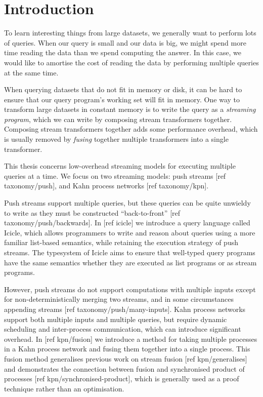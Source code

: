 \section{Introduction}

To learn interesting things from large datasets, we generally want to perform lots of queries.
When our query is small and our data is big, we might spend more time reading the data than we spend computing the answer.
In this case, we would like to amortise the cost of reading the data by performing multiple queries at the same time.

When querying datasets that do not fit in memory or disk, it can be hard to ensure that our query program's working set will fit in memory.
One way to transform large datasets in constant memory is to write the query as a \emph{streaming program}, which we can write by composing stream transformers together.
Composing stream transformers together adds some performance overhead, which is usually removed by \emph{fusing} together multiple transformers into a single transformer.


This thesis concerns low-overhead streaming models for executing multiple queries at a time.
We focus on two streaming models: push streams [ref taxonomy/push], and Kahn process networks [ref taxonomy/kpn].

Push streams support multiple queries, but these queries can be quite unwieldy to write as they must be constructed ``back-to-front'' [ref taxonomy/push/backwards].
In [ref icicle] we introduce a query language called Icicle, which allows programmers to write and reason about queries using a more familiar list-based semantics, while retaining the execution strategy of push streams.
The typesystem of Icicle aims to ensure that well-typed query programs have the same semantics whether they are executed as list programs or as stream programs.

However, push streams do not support computations with multiple inputs except for non-deterministically merging two streams, and in some circumstances appending streams [ref taxonomy/push/many-inputs].
Kahn process networks support both multiple inputs and multiple queries, but require dynamic scheduling and inter-process communication, which can introduce significant overhead.
In [ref kpn/fusion] we introduce a method for taking multiple processes in a Kahn process network and fusing them together into a single process.
This fusion method generalises previous work on stream fusion [ref kpn/generalises] and demonstrates the connection between fusion and synchronised product of processes [ref kpn/synchronised-product], which is generally used as a proof technique rather than an optimisation.


